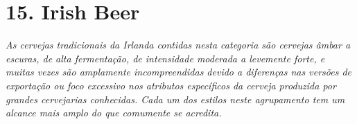 \section*{15. Irish Beer}
\textit{As cervejas tradicionais da Irlanda contidas nesta categoria são cervejas âmbar a escuras, de alta fermentação, de intensidade moderada a levemente forte, e muitas vezes são amplamente incompreendidas devido a diferenças nas versões de exportação ou foco excessivo nos atributos específicos da cerveja produzida por grandes cervejarias conhecidas. Cada um dos estilos neste agrupamento tem um alcance mais amplo do que comumente se acredita.}